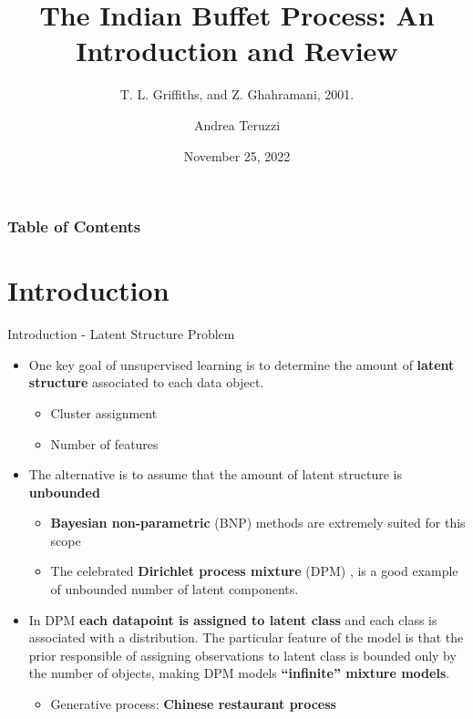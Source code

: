\documentclass[aspectratio=169,xcolor=dvipsnames]{beamer}
\title[IBP, Griffiths and Ghahramani]{The Indian Buffet Process: An Introduction and Review
} \subtitle{T. L. Griffiths, and Z. Ghahramani, 2001.}
\author[andrea.teruzzi@proton.me] {Andrea Teruzzi}
\date[VSI – BayesLab]{November 25, 2022}
\begin{document}
\begin{frame}
    \titlepage
\end{frame}
  \begin{frame}
    \frametitle{Table of Contents}
    \tableofcontents
  \end{frame}


\section{Introduction} 
\begin{frame}{Introduction - Latent Structure Problem}
\setlength{\leftmargini}{0.2cm}
\begin{itemize}
    \item One key goal of unsupervised learning is to determine the amount of \textbf{latent structure} associated to each data object.
    \begin{itemize}
        \item Cluster assignment
        \item Number of features 
    \end{itemize}
    \item The alternative is to assume that the amount of latent structure is \textbf{unbounded} 
    \begin{itemize}
        \item \textbf{Bayesian non-parametric} (BNP) methods are extremely suited for this scope
        \item The celebrated \textbf{Dirichlet process mixture} (DPM) , is a good example of unbounded number of latent components. 
    \end{itemize}
    \item In DPM \textbf{each datapoint is assigned to latent class} and each class is associated with a distribution. The particular feature of the model is that the prior responsible of assigning observations to latent class is bounded only by the number of objects, making DPM models \textbf{“infinite” mixture models}.
    \begin{itemize}
        \item Generative process: \textbf{Chinese restaurant process}
    \end{itemize}
\end{itemize}
\end{frame}
\end{document}
